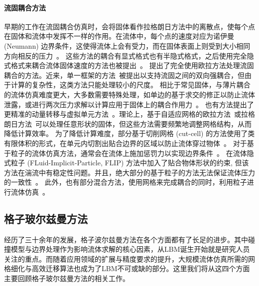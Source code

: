 \paragraph{流固耦合方法}
早期的工作在流固耦合仿真时，会将固体看作拉格朗日方法中的离散点，使每个点在固体和流体中发挥不一样的作用。在流体中，每个点的速度对应为诺伊曼 (Neumann) 边界条件，这使得流体上会有受力，而在固体表面上则受到大小相同方向相反的压力~\citep{Carlson-2004,Genevaux-2003,Takahashi-2002,Foster:2001,Yngve:2000}。
这些方法的耦合有显式格式也有半隐式格式，之后使用完全隐式格式来耦合流体固体速度的方法也被提出~\citep{Klingner-2006,Chentanez:2006:SCP,Batty-2007}。\citet{Teng-2016} 提出了完全使用欧拉方法处理流固耦合的方法。近来，单一框架的方法~\citep{takahashi-2020,fang-2020}被提出以支持流固之间的双向强耦合，但由于计算的复杂性，这类方法只能处理较小的尺度。
相比于常见固体，与薄片耦合的流体仿真难度更大，大多数需要特殊处理，如单边的基于求交的修正以防止流体泄露，或进行两次压力求解以计算应用于固体上的耦合作用力~\citep{Guendelman-2005}。
也有方法提出了更精准的动量转移与虚拟单元方法~\citep{Robinson:2009, Robinson-2008}。理论上，基于自适应网格的欧拉方法~\citep{Elcott-2007,Klingner-2006,Feldman:DF:2005,Feldman-2005,dai-2005}或拉格朗日方法~\citep{Clausen-2013,Misztal:2010}可以处理任意形状的固体，但这些方法需要频繁地调整网格结构，从而降低计算效率。
为了降低计算难度，部分基于切削网格 (cut-cell) 的方法使用了类有限体积的形式，在单元内切割出贴合边界的区域以防止流体穿过物体~\citep{Azevedo-2016,Liu:2015:MVF,weber-2015,Edwards-2014,gibou-2012,Ng-2009,Batty-2007,Roble-2005}。
对于基于粒子的流体仿真方法，通常会在流体上施加惩罚力以实现边界条件~\citep{peer-2015,Ihmsen-2013}。\citet{Gao:2017} 在流体隐式粒子 (FLuid-Implicit-Particle, FLIP) 方法中加入了贴合物体形状的约束, 但该方法在湍流中有稳定性问题。并且，绝大部分的基于粒子的方法无法保证流体压力的一致性~\citep{band-2018}。
此外，也有部分混合方法，使用网格来完成耦合的同时，利用粒子进行流体仿真~\citep{Fei-2019,Fei-2018,hu-2018,Zhang-2016}。

\subsection{格子玻尔兹曼方法}
经历了三十余年的发展，格子波尔兹曼方法在各个方面都有了长足的进步。其中碰撞模型与边界处理作为影响流体求解的核心因素，从LBM诞生开始就是研究人员关注的重点。而随着应用领域的扩展与精度要求的提升，大规模流体仿真所需的网格细化与高效迁移算法也成为了LBM不可或缺的部分。这里我们将从这四个方面主要回顾格子玻尔兹曼方法的相关工作。
\label{sec:1_related_works_LBM}

